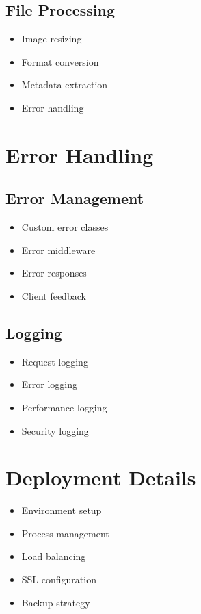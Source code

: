 \subsection{File Processing}
\begin{itemize}
    \item Image resizing
    \item Format conversion
    \item Metadata extraction
    \item Error handling
\end{itemize}

\section{Error Handling}
\subsection{Error Management}
\begin{itemize}
    \item Custom error classes
    \item Error middleware
    \item Error responses
    \item Client feedback
\end{itemize}

\subsection{Logging}
\begin{itemize}
    \item Request logging
    \item Error logging
    \item Performance logging
    \item Security logging
\end{itemize}

\section{Deployment Details}
\begin{itemize}
    \item Environment setup
    \item Process management
    \item Load balancing
    \item SSL configuration
    \item Backup strategy
\end{itemize}

